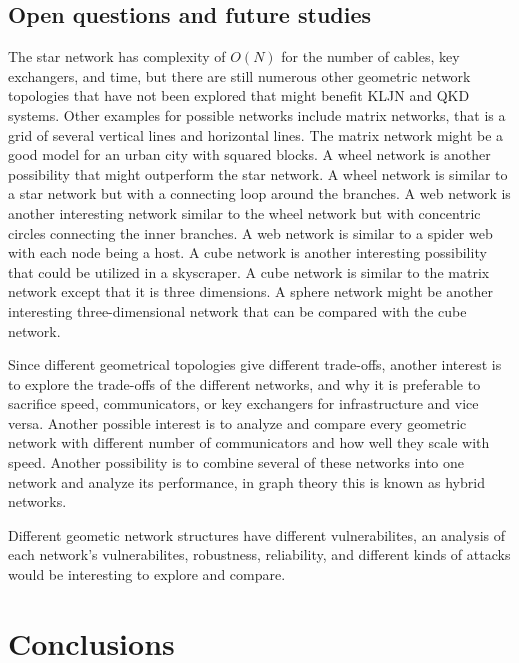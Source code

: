 \documentclass[a4paper,12pt,pdftex]{article}
\begin{document}
\subsection{Open questions and future studies}

The star network has complexity of $O(N)$ for the number of cables, key exchangers, and time, but there are still numerous other geometric network topologies that have not been explored that might benefit KLJN and QKD systems. Other examples for possible networks include matrix networks, that is a grid of several vertical lines and horizontal lines. The matrix network might be a good model for an urban city with squared blocks. A wheel network is another possibility that might outperform the star network. A wheel network is similar to a star network but with a connecting loop around the branches. A web network is another interesting network similar to the wheel network but with concentric circles connecting the inner branches. A web network is similar to a spider web with each node being a host. A cube network is another interesting possibility that could be utilized in a skyscraper. A cube network is similar to the matrix network except that it is three dimensions. A sphere network might be another interesting three-dimensional network that can be compared with the cube network.

Since different geometrical topologies give different trade-offs, another interest is to explore the trade-offs of the different networks, and why it is preferable to sacrifice speed, communicators, or key exchangers for infrastructure and vice versa. Another possible interest is to analyze and compare every geometric network with different number of communicators and how well they scale with speed. Another possibility is to combine several of these networks into one network and analyze its performance, in graph theory this is known as hybrid networks.

Different geometic network structures have different vulnerabilites, an analysis of each network's vulnerabilites, robustness, reliability, and different kinds of attacks would be interesting to explore and compare. 


\section{Conclusions}
\end{document}
